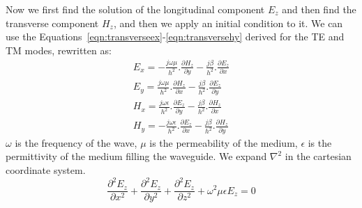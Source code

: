 Now we first find the solution of the longitudinal component $ E_{z} $ and then find the transverse component $ H_{z} $, and then we apply an initial condition to it. We can use the Equations~\ref{eqn:transverseex}-\ref{eqn:transversehy} derived for the TE and TM modes, rewritten as:
\begin{align}
E_x = -\frac{j\omega\mu}{h^2}.\frac{\partial H_z}{\partial y} - \frac{j\beta}{h^2}.\frac{\partial E_z}{\partial x}
\label{eqn:transverseex2}\\
E_y = \frac{j\omega\mu}{h^2}.\frac{\partial H_z}{\partial x} - \frac{j\beta}{h^2}.\frac{\partial E_z}{\partial y}
\label{eqn:transverseey2}\\
H_x = \frac{j\omega\epsilon}{h^2}.\frac{\partial E_z}{\partial y} - \frac{j\beta}{h^2}.\frac{\partial H_z}{\partial x}
\label{eqn:transversehx2}\\
H_y = -\frac{j\omega\epsilon}{h^2}.\frac{\partial E_z}{\partial x} - \frac{j\beta}{h^2}.\frac{\partial H_z}{\partial y}
\label{eqn:transversehy2}
\end{align}
$ \omega $  is the frequency of the wave, $ \mu $   is the permeability of the medium, $ \epsilon $ is the permittivity of the medium filling the waveguide. We expand $ \nabla^{2} $ in the cartesian coordinate system.
\begin{equation}
\frac{\partial ^{2} E_z}{\partial x^2} + \frac{\partial ^2 E_z}{\partial y^2} + \frac{\partial ^2 E_z}{\partial z^2}+ \omega^2\mu\epsilon {E_{z}} = 0
\label{eqn:maxwellele}
\end{equation}

